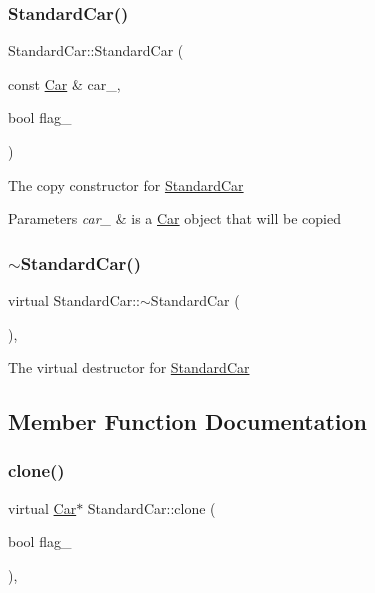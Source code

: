 \subsubsection{\texorpdfstring{Standard\+Car()}{StandardCar()}\hspace{0.1cm}{\footnotesize\ttfamily [2/2]}}
{\footnotesize\ttfamily Standard\+Car\+::\+Standard\+Car (\begin{DoxyParamCaption}\item[{const \mbox{\hyperlink{class_car}{Car}} \&}]{car\+\_\+,  }\item[{bool}]{flag\+\_\+ }\end{DoxyParamCaption})}

The copy constructor for \mbox{\hyperlink{class_standard_car}{Standard\+Car}} 
\begin{DoxyParams}{Parameters}
{\em car\+\_\+} & is a \mbox{\hyperlink{class_car}{Car}} object that will be copied \\
\hline
\end{DoxyParams}
\mbox{\label{class_standard_car_a832e00072d6908d61731b9b78b815fb8}} 
\subsubsection{\texorpdfstring{$\sim$\+Standard\+Car()}{~StandardCar()}}
{\footnotesize\ttfamily virtual Standard\+Car\+::$\sim$\+Standard\+Car (\begin{DoxyParamCaption}{ }\end{DoxyParamCaption})\hspace{0.3cm}{\ttfamily [inline]}, {\ttfamily [virtual]}}

The virtual destructor for \mbox{\hyperlink{class_standard_car}{Standard\+Car}} 

\subsection{Member Function Documentation}
\mbox{\label{class_standard_car_a2fd5dd06bebd68db247bab73bd2176be}} 
\subsubsection{\texorpdfstring{clone()}{clone()}}
{\footnotesize\ttfamily virtual \mbox{\hyperlink{class_car}{Car}}$\ast$ Standard\+Car\+::clone (\begin{DoxyParamCaption}\item[{bool}]{flag\+\_\+ }\end{DoxyParamCaption})\hspace{0.3cm}{\ttfamily [inline]}, {\ttfamily [virtual]}}

